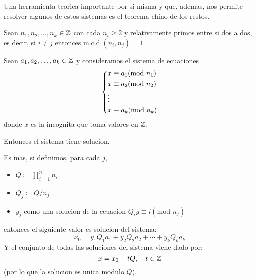 Una herramienta teorica importante por si misma y que, ademas, nos permite resolver algunos de estos sistemas es el teorema chino de los restos.

\begin{theorem}
	Sean \(n_1, n_2, \ldots, n_k \) \(\in  \mathbb{Z} \) con cada \(n_i \geq 2 \) y relativamente primos entre si dos a dos, es decir, si \(i \neq j \) entonces \(\mathrm{m.c.d.}(n_i,n_j 	) = 1 	 \).
	
	Sean \(a_1, a_2, \ldots, a_k \in \mathbb{Z}\) y consideramos el sistema de ecuaciones
	\[
		\begin{dcases}
			x \equiv a_1 (\text{mod } n_1 ) \\
			x \equiv a_2 (\text{mod } n_2 ) \\
			\vdots                          \\
			x \equiv a_k (\text{mod } n_k ) \\
		\end{dcases}
	\]
	donde \(x \) es la incognita que toma valores en \(\mathbb{Z} \).
	
	Entonces el sistema tiene solucion.
	
	Es mas, si definimos, para cada \(j \),
	\begin{itemize}
		\item \(Q \coloneqq \prod\limits_{i =1}^{n } n_i \)
		\item \(Q_j \coloneqq Q / n_j 	\)
		\item \(y_j \) como una solucion de la ecuacion \(Q_i y \equiv i (\text{mod } n_j 	 )\)
	\end{itemize}
	entonces el siguiente valor es solucion del sistema:
	\[
		x_{0} = y_1 Q_1 a_{1} + y_2 Q_2 a_2 + \cdots + y_k Q_k a_k
	\]
	Y el conjunto de todas las soluciones del sistema viene dado por:
	\[
		x = x_0 + tQ, \quad t \in \mathbb{Z}
	\]
	(por lo que la solucion es unica modulo \(Q \)).
\end{theorem}
